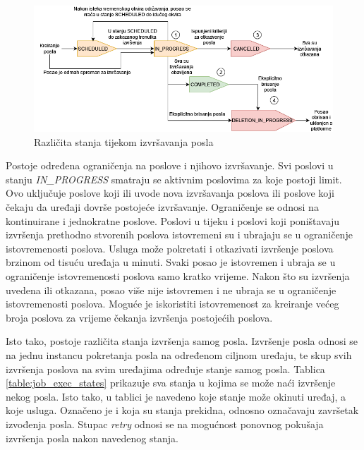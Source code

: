 \begin{figure}[ht]
	\centering
	\includegraphics[scale=0.5]{imgs/job_states}
	\caption{Različita stanja tijekom izvršavanja posla \cite{aws_docs}}
	\label{fig:job_states}
\end{figure}

Postoje određena ograničenja na poslove i njihovo izvršavanje. Svi poslovi u stanju \textit{IN\_PROGRESS} smatraju se aktivnim poslovima za koje postoji limit. Ovo uključuje poslove koji ili uvode nova izvršavanja poslova ili poslove koji čekaju da uređaji dovrše postojeće izvršavanje. Ograničenje se odnosi na kontinuirane i jednokratne poslove. Poslovi u tijeku i poslovi koji poništavaju izvršenja prethodno stvorenih poslova istovremeni su i ubrajaju se u ograničenje istovremenosti poslova. Usluga može pokretati i otkazivati izvršenje poslova brzinom od tisuću uređaja u minuti. Svaki posao je istovremen i ubraja se u ograničenje istovremenosti poslova samo kratko vrijeme. Nakon što su izvršenja uvedena ili otkazana, posao više nije istovremen i ne ubraja se u ograničenje istovremenosti poslova. Moguće je iskoristiti istovremenost za kreiranje većeg broja poslova za vrijeme čekanja izvršenja postojećih poslova.

Isto tako, postoje različita stanja izvršenja samog posla. Izvršenje posla odnosi se na jednu instancu pokretanja posla na određenom ciljnom uređaju, te skup svih izvršenja poslova na svim uređajima određuje stanje samog posla. Tablica \ref{table:job_exec_states} prikazuje sva stanja u kojima se može naći izvršenje nekog posla. Isto tako, u tablici je navedeno koje stanje može okinuti uređaj, a koje usluga. Označeno je i koja su stanja prekidna, odnosno označavaju završetak izvođenja posla. Stupac \textit{retry} odnosi se na mogućnost ponovnog pokušaja izvršenja posla nakon navedenog stanja. 

